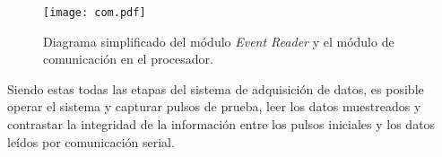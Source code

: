 	\begin{figure}[H]
		\centering
		\texttt{[image: com.pdf]}
		\caption{Diagrama simplificado del módulo \textit{Event Reader} y el módulo de comunicación en el procesador.}
		\label{fig:com}
	\end{figure}
	
	Siendo estas todas las etapas del sistema de adquisición de datos, es posible operar el sistema y capturar pulsos de prueba, leer los datos muestreados y contrastar la integridad de la información entre los pulsos iniciales y los datos leídos por comunicación serial.
	
	
	
